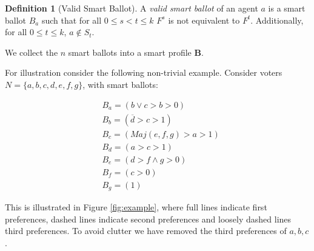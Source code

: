 \documentclass[11pt,a4paper, titlepage]{article}
\theoremstyle{definition}
\newtheorem{definition}[theorem]{Definition}
\newcommand{\Maj}{\mathit{Maj}}
\begin{document}
\begin{definition}[Valid Smart Ballot]
    A \emph{valid smart ballot} of an agent $a$ is a smart ballot $B_a$ such that for all $ 0 \leq s < t \leq k$ $F^s$ is not equivalent to $F^t$. Additionally, for all $0 \leq t \leq k$, $a \notin S_t$.
\end{definition}


We collect the $n$ smart ballots into a smart profile $\mathbf{B}$. 

For illustration consider the following non-trivial example.
Consider voters $N = \{a, b, c, d, e, f, g\}$, with smart ballots:

\begin{align*}
    &B_a =(b \lor c > b > 0) \\
    &B_b = \left(\overline{d} > c > 1 \right) \\
    &B_c = \left(\Maj(e, f, g) > a > 1 \right) \\
    &B_d = (a > c > 1) \\
    &B_e = (d > f \land g > 0) \\
    &B_f = (c > 0) \\
    &B_g = (1)
\end{align*}

This is illustrated in Figure \ref{fig:example}, where full lines indicate first preferences, dashed lines indicate second preferences and loosely dashed lines third preferences. To avoid clutter we have removed the third preferences of $a, b, c$.
\end{document}
